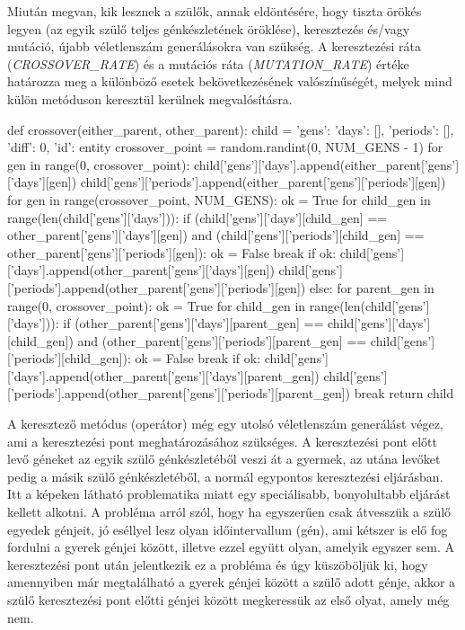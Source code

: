 \documentclass[a4paper,12pt]{article}
\begin{document}
Miután megvan, kik lesznek a szülők, annak eldöntésére, hogy tiszta örökés legyen (az egyik szülő teljes génkészletének öröklése), keresztezés és/vagy mutáció, újabb véletlenszám generálásokra van szükség. A keresztezési ráta (\textsl{CROSSOVER_RATE}) és a mutációs ráta (\textsl{MUTATION_RATE}) értéke határozza meg a különböző esetek bekövetkezésének valószínűségét, melyek mind külön metóduson keresztül kerülnek megvalósításra.

\begin{python}
def crossover(either_parent, other_parent):
    child = {'gens': {'days': [], 'periods': []}, 'diff': 0, 'id': entity}
    crossover_point = random.randint(0, NUM_GENS - 1)
    for gen in range(0, crossover_point):
        child['gens']['days'].append(either_parent['gens']['days'][gen])
        child['gens']['periods'].append(either_parent['gens']['periods'][gen])
    for gen in range(crossover_point, NUM_GENS):
        ok = True
        for child_gen in range(len(child['gens']['days'])):
            if (child['gens']['days'][child_gen] == other_parent['gens']['days'][gen]) and (child['gens']['periods'][child_gen] == other_parent['gens']['periods'][gen]):
                ok = False
                break
        if ok:
            child['gens']['days'].append(other_parent['gens']['days'][gen])
            child['gens']['periods'].append(other_parent['gens']['periods'][gen])
        else:
            for parent_gen in range(0, crossover_point):
                ok = True
                for child_gen in range(len(child['gens']['days'])):
                    if (other_parent['gens']['days'][parent_gen] == child['gens']['days'][child_gen]) and (other_parent['gens']['periods'][parent_gen] == child['gens']['periods'][child_gen]):
                        ok = False
                        break
                if ok:
                    child['gens']['days'].append(other_parent['gens']['days'][parent_gen])
                    child['gens']['periods'].append(other_parent['gens']['periods'][parent_gen])
                    break
    return child

A keresztező metódus (operátor) még egy utolsó véletlenszám generálást végez, ami a keresztezési pont meghatározásához szükséges. A keresztezési pont előtt levő géneket az egyik szülő génkészletéből veszi át a gyermek, az utána levőket pedig a másik szülő génkészletéből, a normál egypontos keresztezési eljárásban. Itt a képeken látható problematika miatt egy speciálisabb, bonyolultabb eljárást kellett alkotni. A probléma arról szól, hogy ha egyszerűen csak átvesszük a szülő egyedek génjeit, jó eséllyel lesz olyan időintervallum (gén), ami kétszer is elő fog fordulni a gyerek génjei között, illetve ezzel együtt olyan, amelyik egyszer sem. A keresztezési pont után jelentkezik ez a probléma és úgy küszöböljük ki, hogy amennyiben már megtalálható a gyerek génjei között a szülő adott génje, akkor a szülő keresztezési pont előtti génjei között megkeressük az első olyat, amely még nem.


\end{python}
\end{document}
